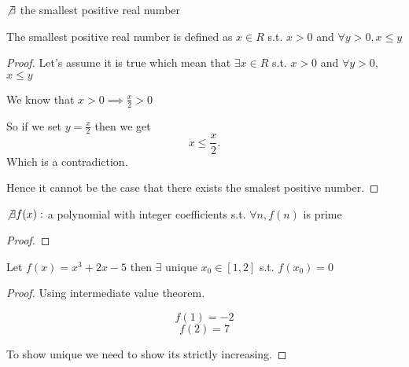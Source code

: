 \begin{eg}
    $\not \exists$ the smallest positive real number
    
    The smallest positive real number is defined as $x \in R$ s.t.  $x > 0$ and  $\forall y > 0, x \leq y$
\end{eg}
\begin{proof}
    Let's assume it is true which mean that $\exists x \in R$ s.t.  $x > 0$ and  $\forall y > 0$,  $x \leq y$

    We know that $x > 0 \implies \frac{x}{2} > 0$ 

    So if we set $y = \frac{x}{2}$ then we get \[
    x \leq \frac{x}{2}
    .\] 
    Which is a contradiction.

    Hence it cannot be the case that there exists the smalest positive number.
\end{proof}
\begin{eg}
    $\not \exists f(x): $ a polynomial with integer coefficients s.t.  $\forall n, f(n)$ is prime
\end{eg}
\begin{proof}
    
\end{proof}

\begin{eg}
    Let $f(x) = x^3 + 2x - 5$ then $\exists \text { unique }x_0 \in [1,2]$ s.t. $f(x_0) = 0$
\end{eg}
\begin{proof}
    Using intermediate value theorem.

    $$f(1) = -2$$
    $$f(2) = 7$$


    To show unique we need to show its strictly increasing.
\end{proof}


